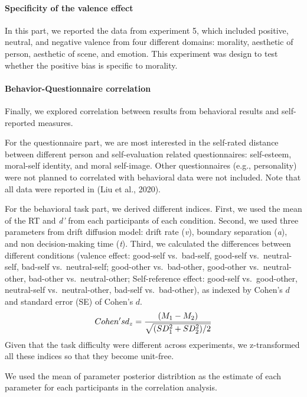 \documentclass[
  english,
  man]{apa6}
\let\oldparagraph\paragraph
\renewcommand{\paragraph}[1]{\oldparagraph{#1}\mbox{}}
\begin{document}
\hypertarget{specificity-of-the-valence-effect}{%
\paragraph{Specificity of the valence effect}\label{specificity-of-the-valence-effect}}

In this part, we reported the data from experiment 5, which included positive, neutral, and negative valence from four different domains: morality, aesthetic of person, aesthetic of scene, and emotion. This experiment was design to test whether the positive bias is specific to morality.

\hypertarget{behavior-questionnaire-correlation}{%
\paragraph{Behavior-Questionnaire correlation}\label{behavior-questionnaire-correlation}}

Finally, we explored correlation between results from behavioral results and self-reported measures.

For the questionnaire part, we are most interested in the self-rated distance between different person and self-evaluation related questionnaires: self-esteem, moral-self identity, and moral self-image. Other questionnaires (e.g., personality) were not planned to correlated with behavioral data were not included. Note that all data were reported in (Liu et al., 2020).

For the behavioral task part, we derived different indices. First, we used the mean of the RT and \emph{d'} from each participants of each condition. Second, we used three parameters from drift diffusion model: drift rate (\emph{v}), boundary separation (\emph{a}), and non decision-making time (\emph{t}). Third, we calculated the differences between different conditions (valence effect: good-self vs.~bad-self, good-self vs.~neutral-self, bad-self vs.~neutral-self; good-other vs.~bad-other, good-other vs.~neutral-other, bad-other vs.~neutral-other; Self-reference effect: good-self vs.~good-other, neutral-self vs.~neutral-other, bad-self vs.~bad-other), as indexed by Cohen's \(d\) and standard error (SE) of Cohen's \(d\).
\[ Cohen's \space d_{z} = \frac {(M_{1} - M_{2})} {\sqrt{(SD_{1}^2 + SD_{2}^2)/2}}\]
Given that the task difficulty were different across experiments, we z-transformed all these indices so that they become unit-free.

We used the mean of parameter posterior distribtion as the estimate of each parameter for each participants in the correlation analysis.
\end{document}
